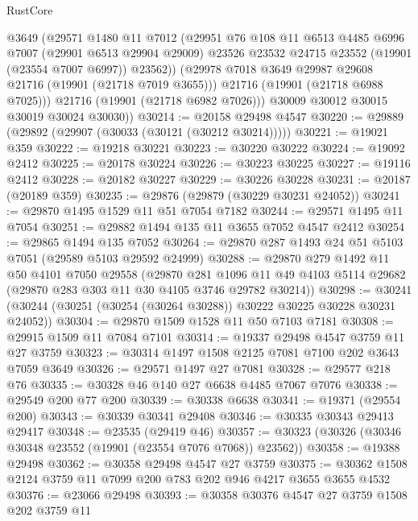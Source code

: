\begin{lexlean}{RustCore}
\begin{coremodule}
            @3649
            (@29571
              @1480
              @11
              @7012
              (@29951
                @76
                @108
                @11
                @6513
                @4485
                @6996
                @7007
                (@29901 @6513 @29904 @29009)
                @23526
                @23532
                @24715
                @23552
                (@19901 (@23554 @7007 @6997))
                @23562))
            (@29978 @7018 @3649 @29987 @29608 @21716 (@19901 (@21718 @7019 @3655)))
            @21716
            (@19901 (@21718 @6988 @7025)))
          @21716
          (@19901 (@21718 @6982 @7026)))
        @30009
        @30012
        @30015
        @30019
        @30024
        @30030))
@30214 := @20158 @29498 @4547
@30220 := @29889 (@29892 (@29907 (@30033 (@30121 (@30212 @30214)))))
@30221 := @19021 @359
@30222 := @19218 @30221
@30223 := @30220 @30222
@30224 := @19092 @2412
@30225 := @20178 @30224
@30226 := @30223 @30225
@30227 := @19116 @2412
@30228 := @20182 @30227
@30229 := @30226 @30228
@30231 := @20187 (@20189 @359)
@30235 := @29876 (@29879 (@30229 @30231 @24052))
@30241 := @29870 @1495 @1529 @11 @51 @7054 @7182
@30244 := @29571 @1495 @11 @7054
@30251 := @29882 @1494 @135 @11 @3655 @7052 @4547 @2412
@30254 := @29865 @1494 @135 @7052
@30264 := @29870 @287 @1493 @24 @51 @5103 @7051 (@29589 @5103 @29592 @24999)
@30288 := @29870
    @279
    @1492
    @11
    @50
    @4101
    @7050
    @29558
    (@29870
      @281
      @1096
      @11
      @49
      @4103
      @5114
      @29682
      (@29870 @283 @303 @11 @30 @4105 @3746 @29782 @30214))
@30298 := @30241 (@30244 (@30251 (@30254 (@30264 @30288)) @30222 @30225 @30228 @30231 @24052))
@30304 := @29870 @1509 @1528 @11 @50 @7103 @7181
@30308 := @29915 @1509 @11 @7084 @7101
@30314 := @19337 @29498 @4547 @3759 @11 @27 @3759
@30323 := @30314 @1497 @1508 @2125 @7081 @7100 @202 @3643 @7059 @3649
@30326 := @29571 @1497 @27 @7081
@30328 := @29577 @218 @76
@30335 := @30328 @46 @140 @27 @6638 @4485 @7067 @7076
@30338 := @29549 @200 @77 @200
@30339 := @30338 @6638
@30341 := @19371 (@29554 @200)
@30343 := @30339 @30341 @29408
@30346 := @30335 @30343 @29413 @29417
@30348 := @23535 (@29419 @46)
@30357 := @30323 (@30326 (@30346 @30348 @23552 (@19901 (@23554 @7076 @7068)) @23562))
@30358 := @19388 @29498
@30362 := @30358 @29498 @4547 @27 @3759
@30375 := @30362 @1508 @2124 @3759 @11 @7099 @200 @783 @202 @946 @4217 @3655 @3655 @4532
@30376 := @23066 @29498
@30393 := @30358
    @30376
    @4547
    @27
    @3759
    @1508
    @202
    @3759
    @11

\end{coremodule}
\end{lexlean}

